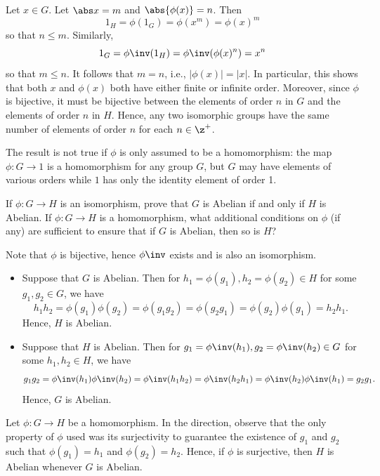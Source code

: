 \begin{sol}
    Let $x \in G$. Let $\abs x = m$ and $\abs{\phi(x)} = n$. Then
    \[1_H = \phi(1_G) = \phi(x^m) = \phi(x)^m\]
    so that $n \leq m$. Similarly,
    \[1_G = \phi\inv(1_H) = \phi\inv(\phi(x)^n) = x^n\]
    so that $m \leq n$. It follows that $m = n$, i.e., $|\phi(x)| = |x|$. In particular, this shows that both $x$ and $\phi(x)$ both have either finite or infinite order. Moreover, since $\phi$ is bijective, it must be bijective between the elements of order $n$ in $G$ and the elements of order $n$ in $H$. Hence, any two isomorphic groups have the same number of elements of order $n$ for each $n \in \z^+$.

    The result is not true if $\phi$ is only assumed to be a homomorphism: the map $\phi : G \to 1$ is a homomorphism for any group $G$, but $G$ may have elements of various orders while $1$ has only the identity element of order 1.
\end{sol}

\begin{exercise}\label{ex1.6.3}
    If $\phi : G \to H$ is an isomorphism, prove that $G$ is Abelian if and only if $H$ is Abelian. If $\phi : G \to H$ is a homomorphism, what additional conditions on $\phi$ (if any) are sufficient to ensure that if $G$ is Abelian, then so is $H$?
\end{exercise}

\begin{sol}
    Note that $\phi$ is bijective, hence $\phi\inv$ exists and is also an isomorphism.
    \begin{itemize}
        \item [\rightimp] Suppose that $G$ is Abelian. Then for $h_1 = \phi(g_1), h_2 = \phi(g_2) \in H$ for some $g_1, g_2 \in G$, we have
        \[h_1h_2 = \phi(g_1)\phi(g_2) = \phi(g_1g_2) = \phi(g_2g_1) = \phi(g_2)\phi(g_1) = h_2h_1.\]
        Hence, $H$ is Abelian.
        \item [\leftimp] Suppose that $H$ is Abelian. Then for $g_1 = \phi\inv(h_1), g_2 = \phi\inv(h_2) \in G$ for some $h_1, h_2 \in H$, we have
        \[g_1g_2 = \phi\inv(h_1)\phi\inv(h_2) = \phi\inv(h_1h_2) = \phi\inv(h_2h_1) = \phi\inv(h_2)\phi\inv(h_1) = g_2g_1.\]
        Hence, $G$ is Abelian.
    \end{itemize}
    Let $\phi : G \to H$ be a homomorphism. In the \rightimp direction, observe that the only property of $\phi$ used was its surjectivity to guarantee the existence of $g_1$ and $g_2$ such that $\phi(g_1) = h_1$ and $\phi(g_2) = h_2$. Hence, if $\phi$ is surjective, then $H$ is Abelian whenever $G$ is Abelian.
\end{sol}

